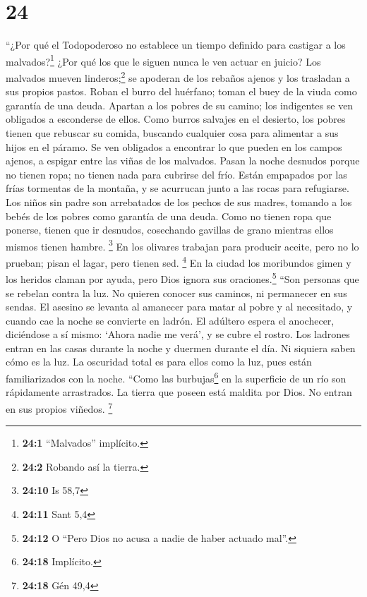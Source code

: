 \hypertarget{section-23}{%
\section{24}\label{section-23}}

 ``¿Por qué el Todopoderoso no establece un tiempo
definido para castigar a los malvados?\footnote{\textbf{24:1}
  ``Malvados'' implícito.} ¿Por qué los que le siguen nunca le ven
actuar en juicio?  Los malvados mueven
linderos;\footnote{\textbf{24:2} Robando así la tierra.} se apoderan de
los rebaños ajenos y los trasladan a sus propios pastos. 
Roban el burro del huérfano; toman el buey de la viuda como garantía de
una deuda.  Apartan a los pobres de su camino; los
indigentes se ven obligados a esconderse de ellos.  Como
burros salvajes en el desierto, los pobres tienen que rebuscar su
comida, buscando cualquier cosa para alimentar a sus hijos en el páramo.
 Se ven obligados a encontrar lo que pueden en los campos
ajenos, a espigar entre las viñas de los malvados.  Pasan
la noche desnudos porque no tienen ropa; no tienen nada para cubrirse
del frío.  Están empapados por las frías tormentas de la
montaña, y se acurrucan junto a las rocas para refugiarse.
 Los niños sin padre son arrebatados de los pechos de sus
madres, tomando a los bebés de los pobres como garantía de una deuda.
 Como no tienen ropa que ponerse, tienen que ir desnudos,
cosechando gavillas de grano mientras ellos mismos tienen hambre.
\footnote{\textbf{24:10} Is 58,7}  En los olivares
trabajan para producir aceite, pero no lo prueban; pisan el lagar, pero
tienen sed. \footnote{\textbf{24:11} Sant 5,4}  En la
ciudad los moribundos gimen y los heridos claman por ayuda, pero Dios
ignora sus oraciones.\footnote{\textbf{24:12} O ``Pero Dios no acusa a
  nadie de haber actuado mal''.}  ``Son personas que se
rebelan contra la luz. No quieren conocer sus caminos, ni permanecer en
sus sendas.  El asesino se levanta al amanecer para matar
al pobre y al necesitado, y cuando cae la noche se convierte en ladrón.
 El adúltero espera el anochecer, diciéndose a sí mismo:
`Ahora nadie me verá', y se cubre el rostro.  Los
ladrones entran en las casas durante la noche y duermen durante el día.
Ni siquiera saben cómo es la luz.  La oscuridad total es
para ellos como la luz, pues están familiarizados con la noche.
 ``Como las burbujas\footnote{\textbf{24:18} Implícito.}
en la superficie de un río son rápidamente arrastrados. La tierra que
poseen está maldita por Dios. No entran en sus propios viñedos.
\footnote{\textbf{24:18} Gén 49,4}

